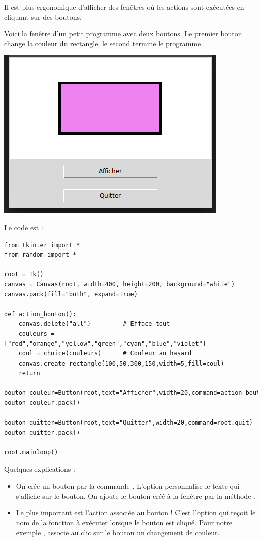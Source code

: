 \documentclass[11pt,class=report,crop=false]{standalone}
\begin{document}
\begin{cours}


Il est plus ergonomique d'afficher des fenêtres où les actions sont exécutées en cliquant sur des boutons.

Voici la fenêtre d'un petit programme avec deux boutons. Le premier bouton change la couleur du rectangle, le second termine le programme.
\begin{center}
\includegraphics[scale=\myscale,scale=0.6]{ecran-stat-cours-boutons}
\end{center}
Le code est :
\begin{lstlisting}
from tkinter import *
from random import *

root = Tk()     
canvas = Canvas(root, width=400, height=200, background="white")
canvas.pack(fill="both", expand=True)

def action_bouton():
    canvas.delete("all")         # Efface tout
    couleurs = ["red","orange","yellow","green","cyan","blue","violet"]
    coul = choice(couleurs)      # Couleur au hasard
    canvas.create_rectangle(100,50,300,150,width=5,fill=coul)
    return

bouton_couleur=Button(root,text="Afficher",width=20,command=action_bouton)
bouton_couleur.pack()

bouton_quitter=Button(root,text="Quitter",width=20,command=root.quit)
bouton_quitter.pack()

root.mainloop()
\end{lstlisting}

Quelques explications :
\begin{itemize}
  \item On crée un bouton par la commande . L'option  personnalise le texte qui s'affiche sur le bouton. On ajoute le bouton créé à la fenêtre par la méthode .
  \item Le plus important est l'action associée au bouton ! C'est l'option  qui reçoit le nom de la fonction à exécuter lorsque le bouton est cliqué. Pour notre exemple , associe au clic sur le bouton un changement de couleur.
  

\end{itemize}
\end{cours}
\end{document}
